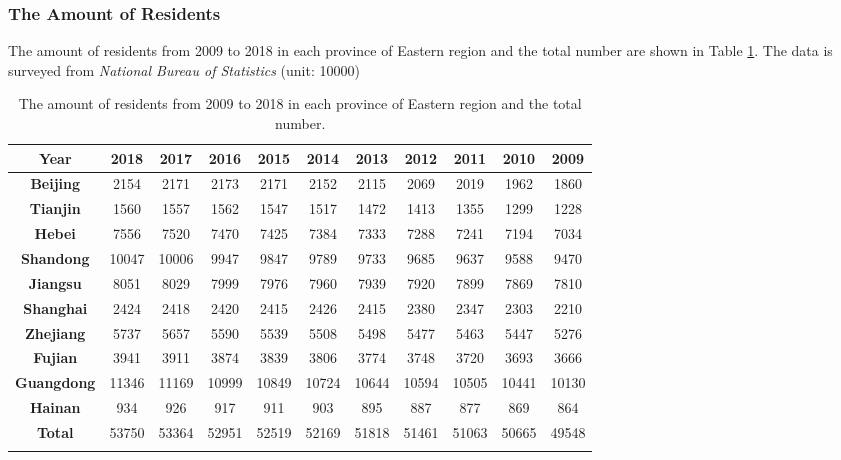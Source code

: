 \documentclass{apmcmthesis}
\begin{document}
\subsubsection{The Amount of Residents}
\hspace{2em}The amount of residents from 2009 to 2018 in each province of Eastern region and the total number are shown in Table \ref{tabel1}. The data is surveyed from \textit{National Bureau of Statistics} (unit: 10000)  
\begin{table}[h]
\scriptsize
\centering
\caption{The amount of residents from 2009 to 2018 in each province of Eastern region and the total number.} 
\begin{tabular}{ccccccccccc}
\toprule
  \textbf{Year} &\textbf{2018} & \textbf{2017} & \textbf{2016} & \textbf{2015} & \textbf{2014} & \textbf{2013} & \textbf{2012} & \textbf{2011} & \textbf{2010} & \textbf{2009}  \\
\midrule
   \textbf{Beijing} & 2154  & 2171  & 2173  & 2171  & 2152  & 2115  & 2069  & 2019  & 1962  & 1860 \\
   \textbf{Tianjin} & 1560  & 1557  & 1562  & 1547  & 1517  & 1472  & 1413  & 1355  & 1299  & 1228  \\
   \textbf{Hebei}   & 7556  & 7520  & 7470  & 7425  & 7384  & 7333  & 7288  & 7241  & 7194  & 7034   \\
   \textbf{Shandong}& 10047 & 10006 & 9947  & 9847  & 9789  & 9733  & 9685  & 9637  & 9588  & 9470\\
   \textbf{Jiangsu} & 8051  & 8029  & 7999  & 7976  & 7960  & 7939  & 7920  & 7899  & 7869  & 7810   \\
   \textbf{Shanghai}& 2424  & 2418  & 2420  & 2415  & 2426  & 2415  & 2380  & 2347  & 2303  & 2210 \\
   \textbf{Zhejiang}& 5737  & 5657  & 5590  & 5539  & 5508  & 5498  & 5477  & 5463  & 5447  & 5276  \\
   \textbf{Fujian}  & 3941  & 3911  & 3874  & 3839  & 3806  & 3774  & 3748  & 3720  & 3693  & 3666    \\
   \textbf{Guangdong}&11346 & 11169 & 10999 & 10849 & 10724 & 10644 & 10594 & 10505 & 10441 & 10130  \\
   \textbf{Hainan}  & 934   & 926   & 917   & 911   & 903   & 895   & 887   & 877   & 869   & 864    \\
   \textbf{Total} & 53750 & 53364 & 52951 & 52519 & 52169 & 51818 & 51461 & 51063 & 50665 & 49548\\
\bottomrule \label{tabel1}
\end{tabular}
\end{table}
\end{document}
